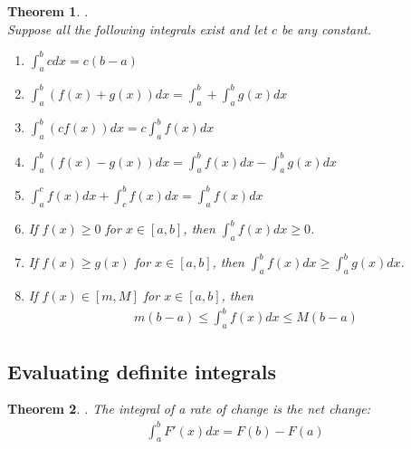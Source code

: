 \documentclass{article}
\theoremstyle{sltheorem}
\newtheorem{theorem}{Theorem}[section]
\begin{document}
\begin{theorem}
    .\\
    Suppose all the following integrals exist and let $c$ be any constant.
    \begin{enumerate}
        \item $\int_a^b cdx = c(b-a)$
        \item $\int_a^b(f(x)+g(x))dx=\int_a^b+\int_a^bg(x)dx$
        \item $\int_a^b(cf(x))dx=c\int_a^bf(x)dx$
        \item $\int_a^b(f(x)-g(x))dx=\int_a^bf(x)dx-\int_a^bg(x)dx$
        \item $\int_a^cf(x)dx+\int_c^bf(x)dx = \int_a^bf(x)dx$
        \item If $f(x)\geq 0$ for $x\in[a,b]$, then $\int_a^b f(x)dx \geq 0$.
        \item If $f(x)\geq g(x)$ for $x\in[a,b]$, then $\int_a^b f(x)dx\geq \int_a^b g(x)dx$.
        \item If $f(x)\in[m,M]$ for $x\in[a,b]$, then 
        \begin{align*}
            m(b-a)\leq \int_a^b f(x)dx \leq M(b-a)
        \end{align*}
    \end{enumerate}
\end{theorem}
\subsection{Evaluating definite integrals}
\begin{theorem}
    . The integral of a rate of change is the net change:
    \begin{align*}
        \int_a^bF'(x)dx=F(b)-F(a)
    \end{align*}
\end{theorem}
\end{document}
